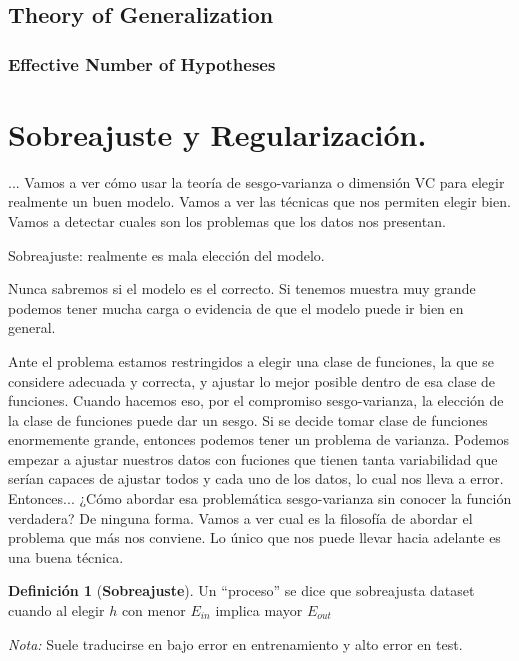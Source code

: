 \documentclass[11pt,a4paper]{article}
\theoremstyle{definition}
\newtheorem{definition}{Definición}[section]
\begin{document}
	\subsection{Theory of Generalization}
	
	\subsubsection{Effective Number of Hypotheses}
	\newpage

	\section{Sobreajuste y Regularización.}	
	... Vamos a ver cómo usar la teoría de sesgo-varianza o dimensión VC para elegir realmente un buen modelo. Vamos a ver las técnicas que nos permiten elegir bien. Vamos a detectar cuales son los problemas que los datos nos presentan.
	
	Sobreajuste: realmente es mala elección del modelo.
	
	Nunca sabremos si el modelo es el correcto. Si tenemos muestra muy grande podemos tener mucha carga o evidencia de que el modelo puede ir bien en general.
	
	Ante el problema estamos restringidos a elegir una clase de funciones, la que se considere adecuada y correcta, y ajustar lo mejor posible dentro de esa clase de funciones. Cuando hacemos eso, por el compromiso sesgo-varianza, la elección de la clase de funciones puede dar un sesgo. Si se decide tomar clase de funciones enormemente grande, entonces podemos tener un problema de varianza. Podemos empezar a ajustar nuestros datos con fuciones que tienen tanta variabilidad que serían capaces de ajustar todos y cada uno de los datos, lo cual nos lleva a error.\\
	
	Entonces... ¿Cómo abordar esa problemática sesgo-varianza sin conocer la función verdadera? De ninguna forma. Vamos a ver cual es la filosofía de abordar el problema que más nos conviene. Lo único que nos puede llevar hacia adelante es una buena técnica.
	
	\begin{definition}[\textbf{Sobreajuste}]
	Un ``proceso'' se dice que sobreajusta dataset cuando al elegir $h$ con menor $E_{in}$ implica mayor $E_{out}$
	\end{definition}
	
	\textit{Nota:} Suele  traducirse en bajo error en entrenamiento y alto error en test.
	
\end{document}
